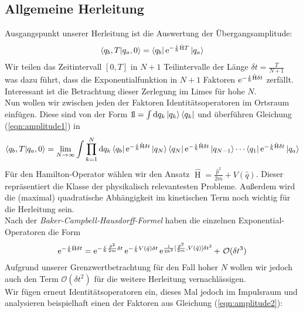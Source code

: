 \subsection{Allgemeine Herleitung}
Ausgangspunkt unserer Herleitung ist die Auswertung der Übergangsamplitude:
\begin{align}
	\braket{q_b,T}{q_a,0} = \bra{q_b}\operatorname{e}^{-\frac{i}{\hbar}\hat{\operatorname{H}}T}\ket{q_a} \label{eqn:amplitude1}
\end{align}
Wir teilen das Zeitintervall $[0,T]$ in $N+1$ Teilintervalle der Länge $\delta t = \frac{T}{N+1}$ was dazu führt, dass die Exponentialfunktion in $N+1$ Faktoren $\operatorname{e}^{-\frac{i}{\hbar}\hat{\operatorname{H}}\delta t}$ zerfällt. Interessant ist die Betrachtung dieser Zerlegung im Limes für hohe $N$. \\
Nun wollen wir zwischen jeden der Faktoren Identitätsoperatoren im Ortsraum einfügen. Diese sind von der Form 
	$\mathrm{1\!l} = \int \dd q_k \ket{q_k}\bra{q_k}$ und überführen Gleichung (\ref{eqn:amplitude1}) in 
\begin{align}
	\braket{q_b,T}{q_a,0} = \lim_{N\rightarrow\infty} \int \prod_{k=1}^{N} \dd q_k \bra{q_b}\operatorname{e}^{-\frac{i}{\hbar}\hat{\operatorname{H}}\delta t}\ket{q_N}\bra{q_N}\operatorname{e}^{-\frac{i}{\hbar}\hat{\operatorname{H}}\delta t}\ket{q_{N-1}} \cdots \bra{q_1}\operatorname{e}^{-\frac{i}{\hbar}\hat{\operatorname{H}}\delta t}\ket{q_a} \label{eqn:amplitude2}
\end{align}
Für den Hamilton-Operator wählen wir den Ansatz $\hat{\operatorname{H}} = \frac{\hat{p}^2}{2m} + V(\hat{q})$. Dieser repräsentiert die Klasse der physikalisch relevantesten Probleme. Außerdem wird die (maximal) quadratische Abhängigkeit im kinetischen Term noch wichtig für die Herleitung sein.\\
Nach der \textit{Baker-Campbell-Hausdorff-Formel} haben die einzelnen Exponential-Operatoren die Form
\begin{align}
	\operatorname{e}^{-\frac{i}{\hbar}\hat{\operatorname{H}}\delta t} = \operatorname{e}^{-\frac{i}{\hbar}\frac{\hat{p}^2}{2m}\delta t}\operatorname{e}^{-\frac{i}{\hbar} V(\hat{q})\delta t}\operatorname{e}^{\frac{1}{2\hbar^2}[\frac{\hat{p}^2}{2m},V(\hat{q})]\delta t^2} + \ \mathcal{O}(\delta t^3)
\end{align}
Aufgrund unserer Grenzwertbetrachtung für den Fall hoher $N$ wollen wir jedoch auch den Term $\mathcal{O}(\delta t^2)$ für die weitere Herleitung vernachlässigen. \\
Wir fügen erneut Identitätsoperatoren ein, dieses Mal jedoch im Impulsraum und analysieren beispielhaft einen der Faktoren aus Gleichung (\ref{eqn:amplitude2}):
